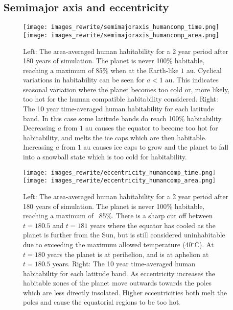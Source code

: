 \documentclass[12pt, onecolumn]{revtex4-2}    %
\newcommand{\degrees}{\ensuremath{^{\circ}}}
\begin{document}
\subsection{Semimajor axis and eccentricity} \label{ssec:qualitative_semimajoraxis_eccentricity}
\begin{figure}
  \texttt{[image: images\_rewrite/semimajoraxis\_humancomp\_time.png]}
  \texttt{[image: images\_rewrite/semimajoraxis\_humancomp\_area.png]}
  \caption{
    Left: The area-averaged human habitability for a 2 year period after 180 years of simulation.
    The planet is never 100\% habitable, reaching a maximum of 85\% when at the Earth-like $1$ au.
    Cyclical variations in habitability can be seen for $a < 1$ au.
    This indicates seasonal variation where the planet becomes too cold or, more likely, too hot for the human compatible habitability considered.
    Right: The 10 year time-averaged human habitability for each latitude band.
    In this case some latitude bands do reach 100\% habitability.
    Decreasing $a$ from $1$ au causes the equator to become too hot for habitability, and melts the ice caps which are then habitable.
    Increasing $a$ from $1$ au causes ice caps to grow and the planet to fall into a snowball state which is too cold for habitability.
  }
  \label{fig:qualitative_semimajoraxis}
\end{figure}

\begin{figure}
  \texttt{[image: images\_rewrite/eccentricity\_humancomp\_time.png]}
  \texttt{[image: images\_rewrite/eccentricity\_humancomp\_area.png]}
  \caption{
    Left: The area-averaged human habitability for a 2 year period after 180 years of simulation.
    The planet is never 100\% habitable, reaching a maximum of ~85\%.
    There is a sharp cut off between $t=180.5$ and $t=181$ years where the equator has cooled as the planet is further from the Sun, but is still considered uninhabitable due to exceeding the maximum allowed temperature (40\degrees C).
    At $t=180$ years the planet is at perihelion, and is at aphelion at $t=180.5$ years.
    Right: The 10 year time-averaged human habitability for each latitude band.
    As eccentricity increases the habitable zones of the planet move outwards towards the poles which are less directly insolated.
    Higher eccentricities both melt the poles and cause the equatorial regions to be too hot.
  }
  \label{fig:qualitative_eccentricity}
\end{figure}
\end{document}
